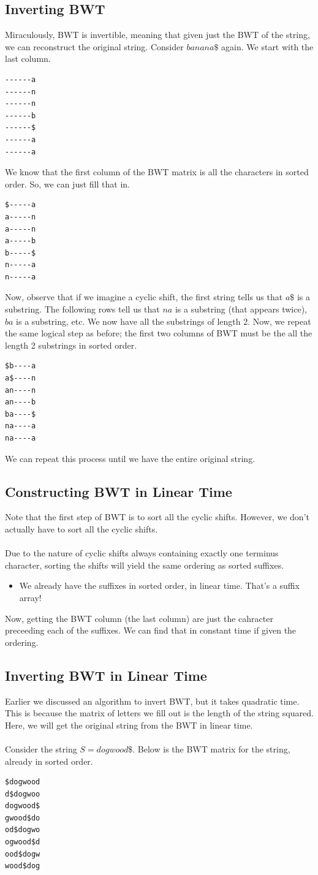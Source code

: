 \documentclass[10pt]{article}
\begin{document}
\subsection*{Inverting BWT}
Miraculously, BWT is invertible, meaning that given just the BWT of the string, we can reconstruct the original string.  Consider $banana\$$ again. We start with the last column.
\begin{verbatim}
------a
------n
------n
------b
------$
------a
------a
\end{verbatim}
We know that the first column of the BWT matrix is all the characters in sorted order.  So, we can just fill that in.
\begin{verbatim}
$-----a
a-----n
a-----n
a-----b
b-----$
n-----a
n-----a
\end{verbatim}
Now, observe that if we imagine a cyclic shift, the first string tells us that $a\$$ is a substring.  The following rows tell us that $na$ is a substring (that appears twice), $ba$ is a substring, etc.  We now have all the substrings of length 2.  Now, we repeat the same logical step as before; the first two columns of BWT must be the all the length 2 substrings in sorted order.  
\begin{verbatim}
$b----a
a$----n
an----n
an----b
ba----$
na----a
na----a
\end{verbatim}
We can repeat this process until we have the entire original string.

\subsection*{Constructing BWT in Linear Time}
Note that the first step of BWT is to sort all the cyclic shifts.  However, we don't actually have to sort all the cyclic shifts.\\\\
Due to the nature of cyclic shifts always containing exactly one terminus character, sorting the shifts will yield the same ordering as sorted suffixes.
\begin{itemize}
    \item We already have the suffixes in sorted order, in linear time.  That's a suffix array!
\end{itemize}
Now, getting the BWT column (the last column) are just the cahracter preceeding each of the suffixes.  We can find that in constant time if given the ordering.

\subsection*{Inverting BWT in Linear Time}
Earlier we discussed an algorithm to invert BWT, but it takes quadratic time.  This is because the matrix of letters we fill out is the length of the string squared.  Here, we will get the original string from the BWT in linear time.\\\\
Consider the string $S = dogwood\$$.  Below is the BWT matrix for the string, already in sorted order.
\begin{verbatim}
$dogwood
d$dogwoo
dogwood$
gwood$do
od$dogwo
ogwood$d
ood$dogw
wood$dog
\end{verbatim}
\end{document}
